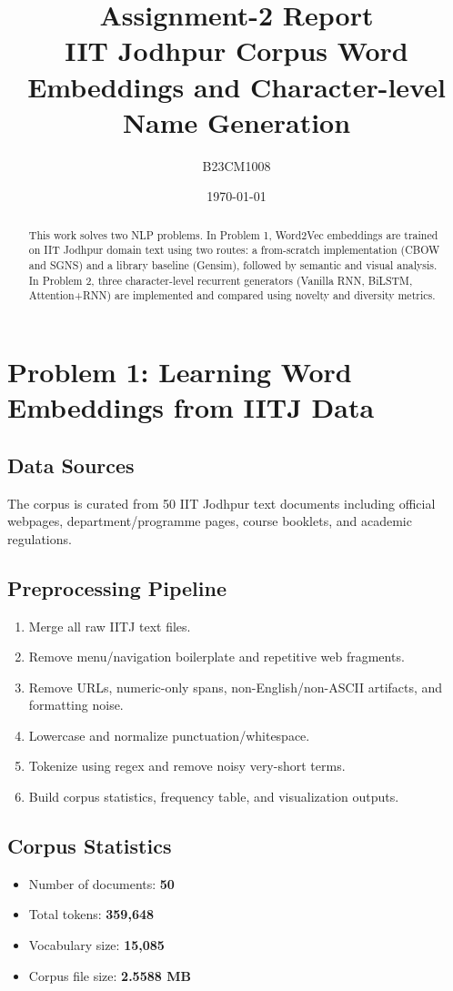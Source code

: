 \documentclass[11pt,a4paper]{article}
\title{Assignment-2 Report\\\large IIT Jodhpur Corpus Word Embeddings and Character-level Name Generation}
\author{B23CM1008}
\date{\today}
\begin{document}
\maketitle

\begin{abstract}
This work solves two NLP problems. In Problem 1, Word2Vec embeddings are trained on IIT Jodhpur domain text using two routes: a from-scratch implementation (CBOW and SGNS) and a library baseline (Gensim), followed by semantic and visual analysis. In Problem 2, three character-level recurrent generators (Vanilla RNN, BiLSTM, Attention+RNN) are implemented and compared using novelty and diversity metrics.
\end{abstract}

\section{Problem 1: Learning Word Embeddings from IITJ Data}

\subsection{Data Sources}
The corpus is curated from 50 IIT Jodhpur text documents including official webpages, department/programme pages, course booklets, and academic regulations.

\subsection{Preprocessing Pipeline}
\begin{enumerate}
    \item Merge all raw IITJ text files.
    \item Remove menu/navigation boilerplate and repetitive web fragments.
    \item Remove URLs, numeric-only spans, non-English/non-ASCII artifacts, and formatting noise.
    \item Lowercase and normalize punctuation/whitespace.
    \item Tokenize using regex and remove noisy very-short terms.
    \item Build corpus statistics, frequency table, and visualization outputs.
\end{enumerate}

\subsection{Corpus Statistics}
\begin{itemize}
    \item Number of documents: \textbf{50}
    \item Total tokens: \textbf{359,648}
    \item Vocabulary size: \textbf{15,085}
    \item Corpus file size: \textbf{2.5588 MB}
\end{itemize}
\end{document}
